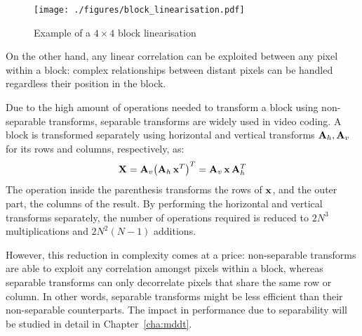 \documentclass[11pt,a4paper,openright,twoside]{book}
\def\usepdfs{1} %
\numberwithin{equation}{section} %
\numberwithin{figure}{section} %
\numberwithin{table}{section} %
\begin{document}
\begin{figure}[tb]
	\centering
	\ifthenelse{\usepdfs = 0}
	{}
	{\texttt{[image: ./figures/block\_linearisation.pdf]}}
	\caption{Example of a $4\times4$ block linearisation}
	\label{fig:block_linearisation}
\end{figure}

On the other hand, any linear correlation can be exploited between any pixel
within a block:
complex relationships between distant pixels can be handled regardless their
position in the block.

Due to the high amount of operations needed to transform a block using
non-separable transforms, separable transforms are widely used in video
coding.
A block is transformed separately using horizontal and vertical transforms
$\mathbf{A}_h, \mathbf{A}_v$ for its rows and columns, respectively, as:
\begin{equation}
	\mathbf{X} = \mathbf{A}_v {\left(\mathbf{A}_h \, \mathbf{x}^T\right)}^T = \mathbf{A}_v \, \mathbf{x} \, \mathbf{A}_h^T
	\label{eqn:sep_transform}
\end{equation}
The operation inside the parenthesis transforms the rows of $\mathbf{x}$, and the
outer part, the columns of the result.
By performing the horizontal and vertical transforms separately, the number of
operations required is reduced to $2N^3$ multiplications and $2N^2(N-1)$
additions.

However, this reduction in complexity comes at a price:
non-separable transforms are able to exploit any correlation amongst pixels
within a block, whereas separable transforms can only decorrelate pixels that
share the same row or column.
In other words, separable transforms might be less efficient than their
non-separable counterparts.
The impact in performance due to separability will be studied in detail
in Chapter~\ref{cha:mddt}.
\end{document}
